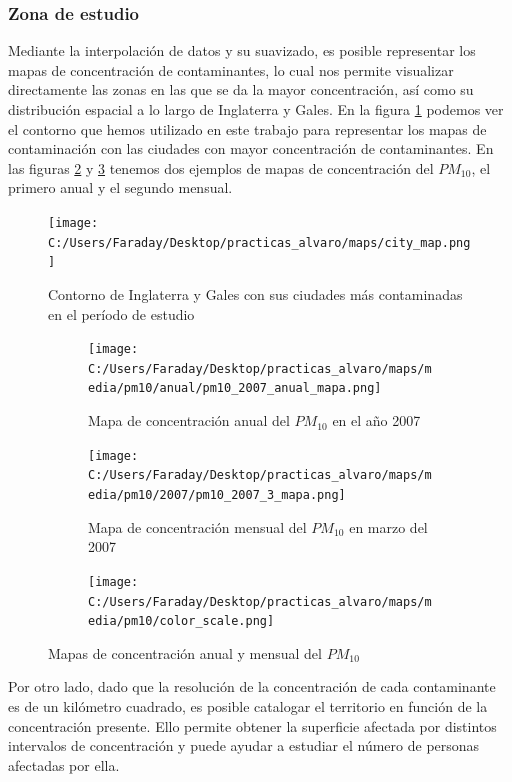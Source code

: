 \documentclass[12pt]{article}
\begin{document}
\subsubsection{Zona de estudio}

Mediante la interpolación de datos y su suavizado, es posible representar los mapas de concentración de contaminantes, lo cual nos permite visualizar directamente las zonas en las que se da la mayor concentración, así como su distribución espacial a lo largo de Inglaterra y Gales. En la figura \ref{fig:map-city} podemos ver el contorno que hemos utilizado en este trabajo para representar los mapas de contaminación con las ciudades con mayor concentración de contaminantes. En las figuras \ref{fig:map-ejem-1} y \ref{fig:map-ejem-2} tenemos dos ejemplos de mapas de concentración del $PM_{10}$, el primero anual y el segundo mensual.

\begin{figure}[H]
\centering
\texttt{[image: C:/Users/Faraday/Desktop/practicas\_alvaro/maps/city\_map.png]}
\caption{Contorno de Inglaterra y Gales con sus ciudades más contaminadas en el período de estudio}
\label{fig:map-city}
\end{figure}

\begin{figure}[H]
\centering
\begin{subfigure}[H]{0.45\textwidth}
\texttt{[image: C:/Users/Faraday/Desktop/practicas\_alvaro/maps/media/pm10/anual/pm10\_2007\_anual\_mapa.png]}
\caption{Mapa de concentración anual del $PM_{10}$ en el año 2007}
\label{fig:map-ejem-1}
\end{subfigure}
%
\begin{subfigure}[H]{0.45\textwidth}
\texttt{[image: C:/Users/Faraday/Desktop/practicas\_alvaro/maps/media/pm10/2007/pm10\_2007\_3\_mapa.png]}
\caption{Mapa de concentración mensual del $PM_{10}$ en marzo del 2007}
\label{fig:map-ejem-2}
\end{subfigure}

\begin{subfigure}[H]{0.45\textwidth}
\texttt{[image: C:/Users/Faraday/Desktop/practicas\_alvaro/maps/media/pm10/color\_scale.png]}
\captionsetup{labelformat=empty}
\caption{}
\end{subfigure}
\caption{Mapas de concentración anual y mensual del $PM_{10}$}
\end{figure}

Por otro lado, dado que la resolución de la concentración de cada contaminante es de un kilómetro cuadrado, es posible catalogar el territorio en función de la concentración presente. Ello permite obtener la superficie afectada por distintos intervalos de concentración y puede ayudar a estudiar el número de personas afectadas por ella.
\end{document}
